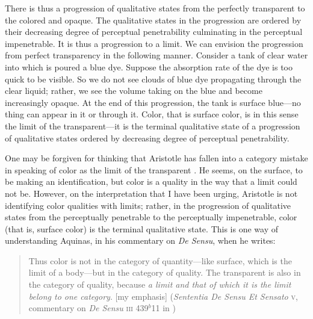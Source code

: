There is thus a progression of qualitative states from the perfectly transparent to the colored and opaque. The qualitative states in the progression are ordered by their decreasing degree of perceptual penetrability culminating in the perceptual impenetrable. It is thus a progression to a limit. We can envision the progression from perfect transparency in the following manner. Consider a tank of clear water into which is poured a blue dye. Suppose the absorption rate of the dye is too quick to be visible. So we do not see clouds of blue dye propagating through the clear liquid; rather, we see the volume taking on the blue and become increasingly opaque. At the end of this progression, the tank is surface blue---no thing can appear in it or through it. Color, that is surface color, is in this sense the limit of the transparent---it is the terminal qualitative state of a progression of qualitative states ordered by decreasing degree of perceptual penetrability.

One may be forgiven for thinking that Aristotle has fallen into a category mistake in speaking of color as the limit of the transparent \citep[65]{Broackes:1999uq}. He seems, on the surface, to be making an identification, but color is a quality in the way that a limit could not be. However, on the interpretation that I have been urging, Aristotle is not identifying color qualities with limits; rather, in the progression of qualitative states from the perceptually penetrable to the perceptually impenetrable, color (that is, surface color) is the terminal qualitative state. This is one way of understanding Aquinas, in his commentary on \emph{De Sensu}, when he writes:
\begin{quote}
	Thus color is not in the category of quantity---like surface, which is the limit of a body---but in the category of quality. The transparent is also in the category of quality, because \emph{a limit and that of which it is the limit belong to one category}. [my emphasis] (\emph{Sententia De Sensu Et Sensato} \textsc{v}, commentary on \emph{De Sensu} \textsc{iii} 439\( ^{b} \)11 in \citealt{White:2005vn})
\end{quote}

